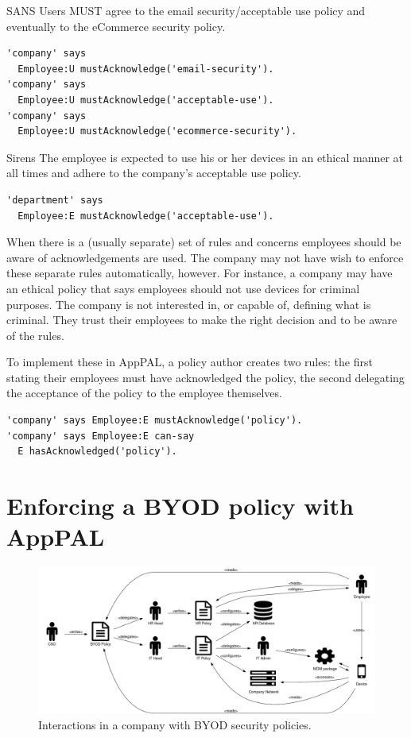 \documentclass[thesis.tex]{subfiles}
\begin{document}
\begin{policyrule}{SANS}
  Users MUST agree to the email security/acceptable use policy and eventually to the eCommerce security policy.
  \begin{lstlisting}
'company' says
  Employee:U mustAcknowledge('email-security').
'company' says
  Employee:U mustAcknowledge('acceptable-use').
'company' says
  Employee:U mustAcknowledge('ecommerce-security').
  \end{lstlisting}
\end{policyrule}
\begin{policyrule}{Sirens}
  The employee is expected to use his or her devices in an ethical manner at all times and adhere to the company's acceptable use policy.
  \begin{lstlisting}
'department' says
  Employee:E mustAcknowledge('acceptable-use').
  \end{lstlisting}
\end{policyrule}

When there is a (usually separate) set of rules and concerns employees should be aware of acknowledgements are used.
The company may not have wish to enforce these separate rules automatically, however.
For instance, a company may have an ethical policy that says employees should not use devices for criminal purposes.
The company is not interested in, or capable of, defining what is criminal.
They trust their employees to make the right decision and to be aware of the rules.

To implement these in AppPAL, a policy author creates two rules:
  the first stating their employees must have acknowledged the policy,
  the second delegating the acceptance of the policy to the employee themselves.
\begin{lstlisting}
'company' says Employee:E mustAcknowledge('policy').
'company' says Employee:E can-say
  E hasAcknowledged('policy').
\end{lstlisting}


\section{Enforcing a BYOD policy with AppPAL}

\begin{figure}
  \centering
  \includegraphics[width=\textwidth]{figures/mdm-overview.pdf}
  \caption{Interactions in a company with BYOD security policies.}
  \label{fig:mdm-overview}
\end{figure}
\end{document}
